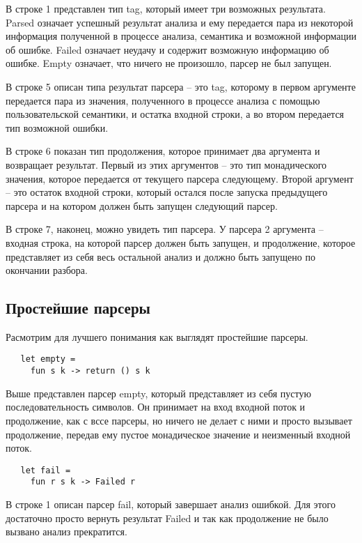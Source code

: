 \documentclass[conference]{IEEEtran}
\begin{document}
В строке 1 представлен тип tag, который имеет три возможных результата. Parsed означает успешный результат анализа и ему передается пара из некоторой информация полученной в процессе анализа, семантика и возможной информации об ошибке. Failed означает неудачу и содержит возможную информацию об ошибке. Empty означает, что ничего не произошло, парсер не был запущен. 

В строке 5 описан типа результат парсера -- это tag, которому в первом аргументе передается пара из значения, полученного в процессе анализа с помощью пользовательской семантики, и остатка входной строки, а во втором передается тип возможной ошибки.

В строке 6 показан тип продолжения, которое принимает два аргумента и возвращает результат. Первый из этих аргументов -- это тип монадического значения, которое передается от текущего парсера следующему. Второй аргумент -- это остаток входной строки, который остался после запуска предыдущего парсера и на котором должен быть запущен следующий парсер.

В строке 7, наконец, можно увидеть тип парсера. У парсера 2 аргумента -- входная строка, на которой парсер должен быть запущен, и продолжение, которое представляет из себя весь остальной анализ и должно быть запущено по окончании разбора.

\subsection{Простейшие парсеры}
Расмотрим для лучшего понимания как выглядят простейшие парсеры.

\begin{lstlisting}
   let empty =
     fun s k -> return () s k
\end{lstlisting}

Выше представлен парсер empty, который представляет из себя пустую последовательность символов. Он принимает на вход входной поток и продолжение, как с вссе парсеры, но ничего не делает с ними и просто вызывает продолжение, передав ему пустое монадическое значение и неизменный входной поток.

\begin{lstlisting}
   let fail =
     fun r s k -> Failed r
\end{lstlisting}

В строке 1 описан парсер fail, который завершает анализ ошибкой. Для этого достаточно просто вернуть результат Failed и так как продолжение не было вызвано анализ прекратится.
\end{document}
